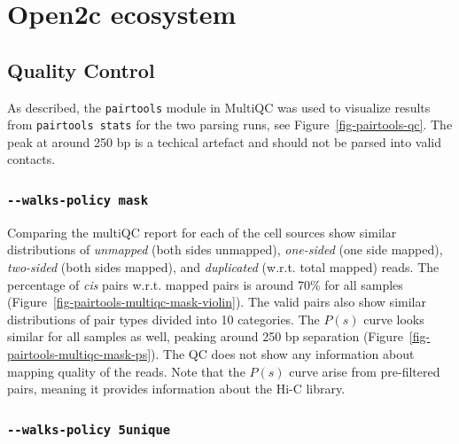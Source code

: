 \documentclass[
  11pt,
  a4paper,
]{scrbook}
\let\origfigure\figure
\let\endorigfigure\endfigure
\renewenvironment{figure}[1][2] {
    \expandafter\origfigure\expandafter[htbp]
} {
    \endorigfigure
}
\begin{document}
\begin{figure}
\begin{minipage}{0.33\linewidth}
{}

\subcaption{\label{fig-explorer-pc3-100kb}}

\end{minipage}%

\caption{\label{fig-explorer-pca}Corrected interaction matrix for
chromosome X along with PC1, 2, or 3, respectively. a-c: 50kb
resolution, d-f: 100kb resolution. \emph{HiCExplorer}.}

\end{figure}%

\section{Open2c ecosystem}\label{open2c-ecosystem}

\subsection{Quality Control}\label{quality-control-1}

As described, the \texttt{pairtools} module in MultiQC was used to
visualize results from \texttt{pairtools\ stats} for the two parsing
runs, see Figure~\ref{fig-pairtools-qc}. The peak at around 250 bp is a
techical artefact and should not be parsed into valid contacts.

\subsubsection{\texorpdfstring{\texttt{-\/-walks-policy\ mask}}{-\/-walks-policy mask}}\label{walks-policy-mask}

Comparing the multiQC report for each of the cell sources show similar
distributions of \emph{unmapped} (both sides unmapped), \emph{one-sided}
(one side mapped), \emph{two-sided} (both sides mapped), and
\emph{duplicated} (w.r.t. total mapped) reads. The percentage of
\emph{cis} pairs w.r.t. mapped pairs is around 70\% for all samples
(Figure~\ref{fig-pairtools-multiqc-mask-violin}). The valid pairs also
show similar distributions of pair types divided into 10 categories. The
\(P(s)\) curve looks similar for all samples as well, peaking around 250
bp separation (Figure~\ref{fig-pairtools-multiqc-mask-ps}). The QC does
not show any information about mapping quality of the reads. Note that
the \(P(s)\) curve arise from pre-filtered pairs, meaning it provides
information about the Hi-C library.

\subsubsection{\texorpdfstring{\texttt{-\/-walks-policy\ 5unique}}{-\/-walks-policy 5unique}}\label{walks-policy-5unique}
\end{document}
